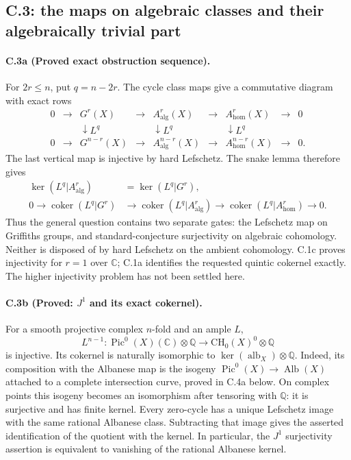 \subsection{C.3: the maps on algebraic classes and their algebraically trivial part}

\paragraph{C.3a (Proved exact obstruction sequence).}
For $2r\le n$, put $q=n-2r$. The cycle class maps give a commutative
diagram with exact rows
\[
\begin{array}{ccccccccc}
0&\to&G^r(X)&\to&A^r_{\mathrm{alg}}(X)&\to&A^r_{\mathrm{hom}}(X)&\to&0\\
 &&\downarrow L^q&&\downarrow L^q&&\downarrow L^q\\
0&\to&G^{n-r}(X)&\to&A^{n-r}_{\mathrm{alg}}(X)&\to&A^{n-r}_{\mathrm{hom}}(X)&\to&0.
\end{array}
\]
The last vertical map is injective by hard Lefschetz. The snake lemma
therefore gives
\[
\begin{split}
\ker(L^q|A^r_{\mathrm{alg}})&=\ker(L^q|G^r),\\
0\longrightarrow\operatorname{coker}(L^q|G^r)&\longrightarrow
\operatorname{coker}(L^q|A^r_{\mathrm{alg}})
\longrightarrow\operatorname{coker}(L^q|A^r_{\mathrm{hom}})
\longrightarrow0.
\end{split}
\]
Thus the general question contains two separate gates: the Lefschetz
map on Griffiths groups, and standard-conjecture surjectivity on
algebraic cohomology. Neither is disposed of by hard Lefschetz on the
ambient cohomology. C.1c proves injectivity for $r=1$ over $\mathbb C$;
C.1a identifies the requested quintic cokernel exactly. The higher
injectivity problem has not been settled here.

\paragraph{C.3b (Proved: $J^1$ and its exact cokernel).}
For a smooth projective complex $n$-fold and an ample $L$,
\[
 L^{n-1}:\operatorname{Pic}^0(X)(\mathbb C)\otimes\mathbb Q
 \longrightarrow\mathrm{CH}_0(X)^0\otimes\mathbb Q
\]
is injective. Its cokernel is naturally isomorphic to
$\ker(\operatorname{alb}_X)\otimes\mathbb Q$. Indeed, its composition
with the Albanese map is the isogeny
$\operatorname{Pic}^0(X)\to\operatorname{Alb}(X)$ attached to a complete
intersection curve, proved in C.4a below. On complex points this
isogeny becomes an isomorphism after tensoring with $\mathbb Q$:
it is surjective and has finite kernel. Every zero-cycle has a unique
Lefschetz image with the same rational Albanese class. Subtracting that
image gives the asserted identification of the quotient with the kernel.
In particular, the $J^1$ surjectivity assertion is equivalent to
vanishing of the rational Albanese kernel.

